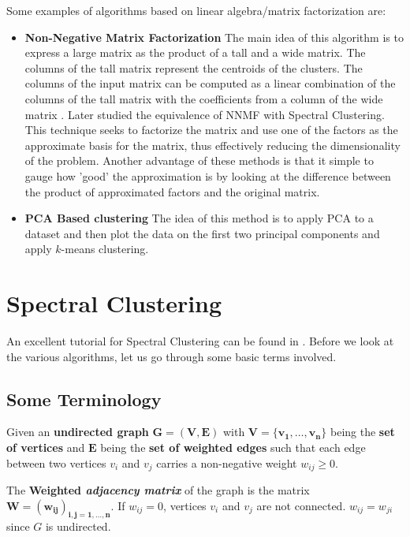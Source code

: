 \documentclass[10pt,a4paper, nocenter]{report}
\begin{document}
    Some examples of algorithms based on linear algebra/matrix factorization are:
    \begin{itemize}
        \item \textbf{Non-Negative Matrix Factorization} The main idea of this algorithm is to express a large matrix as the product of a tall and a wide matrix. The columns of the tall matrix represent the centroids of the clusters. The columns of the input matrix can be computed as a linear combination of the columns of the tall matrix with the coefficients from a column of the wide matrix \cite{Lawton-1971-nnmf} \cite{Paatero1991-nnmf}. Later \cite{Ding05-nnmf-spectral} studied the equivalence of NNMF with Spectral Clustering. This technique seeks to factorize the matrix and use one of the factors as the approximate basis for the matrix, thus effectively reducing the dimensionality of the problem. Another advantage of these methods is that it simple to gauge how 'good' the approximation is by looking at the difference between the product of approximated factors and the original matrix.
        \item \textbf{PCA Based clustering} The idea of this method is to apply PCA to a dataset and then plot the data on the first two principal components and apply $k$-means clustering. \cite{Zhang-2108-pca} 
    \end{itemize}

    


    \chapter{Spectral Clustering}
    An excellent tutorial for Spectral Clustering can be found in \cite{Luxburg2007}. Before we look at the various algorithms, let us go through some basic terms involved.

    \section{Some Terminology}

        Given an \textbf{undirected graph} $\mathbf{G=(V,E)}$ with $\mathbf{V=\{v_{1},\dots,v_{n}\}}$ being the \textbf{set of vertices} and $\mathbf{E}$ being the \textbf{set of weighted edges} such that each edge between two vertices $v_{i}$ and $v_{j}$ carries a non-negative weight $w_{ij} \ge 0$.

        The \textbf{Weighted \textit{adjacency matrix}} of the graph is the matrix $\mathbf{W=(w_{ij})_{i,j=1,\dots,n}}$. If $w_{ij}=0$, vertices $v_{i}$ and $v_{j}$ are not connected. $w_{ij}=w_{ji}$ since $G$ is undirected. 
\end{document}
